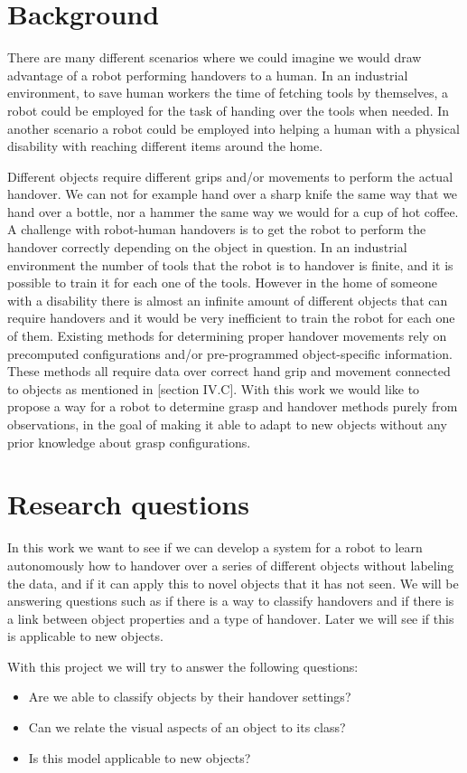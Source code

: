 \section{Background}

There are many different scenarios where we could imagine we would draw advantage of a robot performing handovers to a human. In an industrial environment, to save human workers the time of fetching tools by themselves, a robot could be employed for the task of handing over the tools when needed. In another scenario a robot could be employed into helping a human with a physical disability with reaching different items around the home.

Different objects require different grips and/or movements to perform the actual handover. We can not for example hand over a sharp knife the same way that we hand over a bottle, nor a hammer the same way we would for a cup of hot coffee. A challenge with robot-human handovers is to get the robot to perform the handover correctly depending on the object in question. In an industrial environment the number of tools that the robot is to handover is finite, and it is possible to train it for each one of the tools. However in the home of someone with a disability there is almost an infinite amount of different objects that can require handovers and it would be very inefficient to train the robot for each one of them. Existing methods for determining proper handover movements rely on precomputed configurations and/or pre-programmed object-specific information. These methods all require data over correct hand grip and movement connected to objects as mentioned in \parencite{Chan2013}[section IV.C]. With this work we would like to propose a way for a robot to determine grasp and handover methods purely from observations, in the goal of making it able to adapt to new objects without any prior knowledge about grasp configurations.

\section{Research questions}
\label{sec:research_questions}

In this work we want to see if we can develop a system for a robot to learn autonomously how to handover over a series of different objects without labeling the data, and if it can apply this to novel objects that it has not seen. We will be answering questions such as if there is a way to classify handovers and if there is a link between object properties and a type of handover. Later we will see if this is applicable to new objects.

With this project we will try to answer the following questions:
\begin{itemize}
	\item Are we able to classify objects by their handover settings?
	\item Can we relate the visual aspects of an object to its class?
	\item Is this model applicable to new objects?
\end{itemize}
